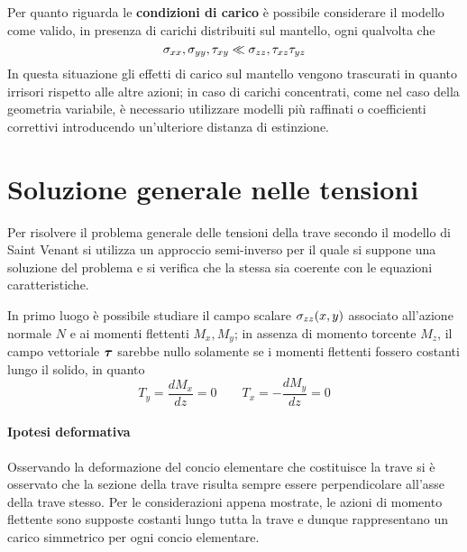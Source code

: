 		\vspace{3mm}
		Per quanto riguarda le \textbf{condizioni di carico} è possibile considerare il modello come valido, in presenza di carichi distribuiti sul mantello, ogni qualvolta che 
		\[ \sigma_{xx},\sigma_{yy},\tau_{xy} \ll \sigma_{zz},\tau_{xz}\tau_{yz}  \]
		In questa situazione gli effetti di carico sul mantello vengono trascurati in quanto irrisori rispetto alle altre azioni; in caso di carichi concentrati, come nel caso della geometria variabile, è necessario utilizzare modelli più raffinati o coefficienti correttivi introducendo un'ulteriore distanza di estinzione.
		
\section{Soluzione generale nelle tensioni}
	Per risolvere il problema generale delle tensioni della trave secondo il modello di Saint Venant si utilizza un approccio semi-inverso per il quale si suppone una soluzione del problema e si verifica che la stessa sia coerente con le equazioni caratteristiche.
	
	\begin{concetto}
		In primo luogo è possibile studiare il campo scalare $\sigma_{zz}(x,y)$ associato all'azione normale $N$ e ai momenti flettenti $M_x,M_y$; in assenza di momento torcente $M_z$, il campo vettoriale $\boldsymbol{\tau}$ sarebbe nullo solamente se i momenti flettenti fossero costanti lungo il solido, in quanto
		\[ T_y = \frac{dM_x}{dz}=0 \qquad T_x = - \frac{dM_y}{dz} = 0 \]
	\end{concetto}		
	
	\paragraph{Ipotesi deformativa} Osservando la deformazione del concio elementare che costituisce la trave si è osservato che la sezione della trave risulta sempre essere perpendicolare all'asse della trave stesso. Per le considerazioni appena mostrate, le azioni di momento flettente sono supposte costanti lungo tutta la trave e dunque rappresentano un carico simmetrico per ogni concio elementare.
	
	
		
